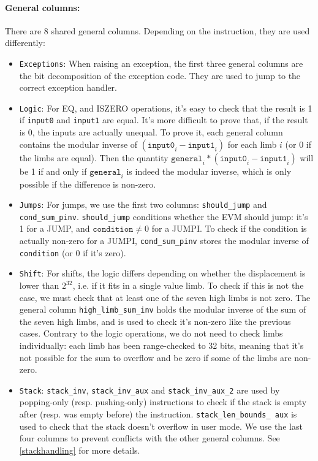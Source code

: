 \paragraph*{General columns:} There are 8 shared general columns. Depending on the instruction, they are used differently:
\begin{itemize}
    \item  \texttt{Exceptions}: When raising an exception, the first three general columns are the bit decomposition of the exception code.
They are used to jump to the correct exception handler.
    \item  \texttt{Logic}: For EQ, and ISZERO operations, it's easy to check that the result is 1 if \texttt{input0} and \texttt{input1} are equal. It's more difficult
to prove that, if the result is 0, the inputs are actually unequal. To prove it, each general column contains the modular inverse of $(\texttt{input0}_i - \texttt{input1}_i)$
for each limb $i$ (or 0 if the limbs are equal). Then the quantity $\texttt{general}_i * (\texttt{input0}_i - \texttt{input1}_i)$ will be 1 if and only if $\texttt{general}_i$ is
indeed the modular inverse, which is only possible if the difference is non-zero.
    \item  \texttt{Jumps}: For jumps, we use the first two columns: \texttt{should\_jump} and \texttt{cond\_sum\_pinv}. \texttt{should\_jump} conditions whether the EVM should jump: it's
1 for a JUMP, and $\texttt{condition} \neq 0$ for a JUMPI. To check if the condition is actually non-zero for a JUMPI, \texttt{cond\_sum\_pinv} stores the modular inverse of
\texttt{condition} (or 0 if it's zero).
    \item  \texttt{Shift}: For shifts, the logic differs depending on whether the displacement is lower than $2^{32}$, i.e. if it fits in a single value limb.
To check if this is not the case, we must check that at least one of the seven high limbs is not zero. The general column \texttt{high\_limb\_sum\_inv} holds the modular inverse
of the sum of the seven high limbs, and is used to check it's non-zero like the previous cases.
Contrary to the logic operations, we do not need to check limbs individually: each limb has been range-checked to 32 bits, meaning that it's not possible for the sum to
overflow and be zero if some of the limbs are non-zero.
    \item  \texttt{Stack}: \texttt{stack\_inv}, \texttt{stack\_inv\_aux} and \texttt{stack\_inv\_aux\_2} are used by popping-only (resp. pushing-only) instructions to check if the stack is empty after (resp. was empty
before) the instruction. \texttt{stack\_len\_bounds\_ aux} is used to check that the stack doesn't overflow in user mode. We use the last four columns to prevent conflicts with the other general columns.
See \ref{stackhandling} for more details.
\end{itemize}
